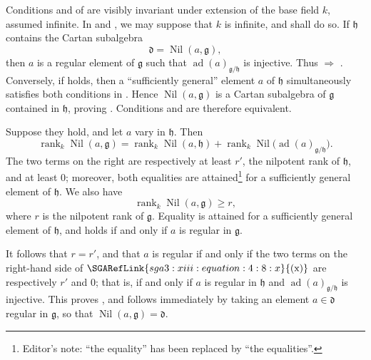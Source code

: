 Conditions  and  of  are visibly invariant under extension
of the base field \(k\), assumed infinite. In  and , we may
suppose that \(k\) is infinite, and shall do so. If \(\mathfrak h\)
contains the Cartan subalgebra
\[
  \mathfrak d=\operatorname{Nil}(a,\mathfrak g),
\]
then \(a\) is a regular element of \(\mathfrak g\) such that
\(\operatorname{ad}(a)_{\mathfrak g/\mathfrak h}\) is injective.
Thus  \(\Rightarrow\) . Conversely, if  holds, then a
``sufficiently general'' element \(a\) of \(\mathfrak h\)
simultaneously satisfies both conditions in . Hence
\(\operatorname{Nil}(a,\mathfrak g)\) is a Cartan subalgebra of
\(\mathfrak g\) contained in \(\mathfrak h\), proving .
Conditions  and  are therefore equivalent.

Suppose they hold, and let \(a\) vary in \(\mathfrak h\). Then
\[
\tag{x}
  \operatorname{rank}_k\operatorname{Nil}(a,\mathfrak g)
  =
  \operatorname{rank}_k\operatorname{Nil}(a,\mathfrak h)
  +
  \operatorname{rank}_k
  \operatorname{Nil}\bigl(
    \operatorname{ad}(a)_{\mathfrak g/\mathfrak h}
  \bigr).
\]
The two terms on the right are respectively at least \(r'\), the
nilpotent rank of \(\mathfrak h\), and at least \(0\); moreover, both
equalities are attained\footnote{Editor's note: ``the equality'' has
been replaced by ``the equalities''.} for a sufficiently general
element of \(\mathfrak h\). We also have
\[
  \operatorname{rank}_k\operatorname{Nil}(a,\mathfrak g)\geq r,
\]
where \(r\) is the nilpotent rank of \(\mathfrak g\). Equality is
attained for a sufficiently general element of \(\mathfrak h\), and
holds if and only if \(a\) is regular in \(\mathfrak g\).

It follows that \(r=r'\), and that \(a\) is regular if and only if
the two terms on the right-hand side of \(\SGARefLink{sga3:xiii:equation:4:8:x}{\mathrm{(x)}}\) are
respectively \(r'\) and \(0\); that is, if and only if \(a\) is
regular in \(\mathfrak h\) and
\(\operatorname{ad}(a)_{\mathfrak g/\mathfrak h}\) is injective.
This proves , and  follows immediately by taking an element
\(a\in\mathfrak d\) regular in \(\mathfrak g\), so that
\(\operatorname{Nil}(a,\mathfrak g)=\mathfrak d\).

